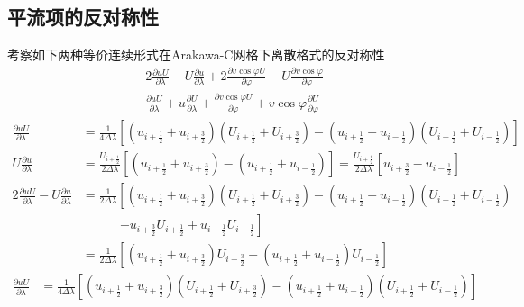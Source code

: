 \documentclass{ctexart}
\begin{document}
\begin{appendix}

\section{平流项的反对称性}
\label{app:平流项的反对称性}
考察如下两种等价连续形式在Arakawa-C网格下离散格式的反对称性
\begin{align}
  2 \frac{\partial u U}{\partial \lambda} - U \frac{\partial u}{\partial \lambda} + 2 \frac{\partial v \cos{\varphi} U}{\partial \varphi} - U \frac{\partial v \cos{\varphi}}{\partial \varphi} \\
  \frac{\partial u U}{\partial \lambda} + u \frac{\partial U}{\partial \lambda} + \frac{\partial v \cos{\varphi} U}{\partial \varphi} + v \cos{\varphi} \frac{\partial U}{\partial \varphi}
\end{align}
\begin{align}
  \frac{\partial u U}{\partial \lambda} & = \frac{1}{4 \Delta{\lambda}} \left[ \left( u_{i+\frac{1}{2}} + u_{i+\frac{3}{2}} \right) \left( U_{i+\frac{1}{2}} + U_{i+\frac{3}{2}} \right) - \left( u_{i+\frac{1}{2}} + u_{i-\frac{1}{2}} \right) \left( U_{i+\frac{1}{2}} + U_{i-\frac{1}{2}} \right) \right] \nonumber \\
  U \frac{\partial u}{\partial \lambda} & = \frac{U_{i+\frac{1}{2}}}{2 \Delta{\lambda}} \left[ \left( u_{i+\frac{1}{2}} + u_{i+\frac{3}{2}} \right) - \left( u_{i+\frac{1}{2}} + u_{i-\frac{1}{2}} \right) \right] = \frac{U_{i+\frac{1}{2}}}{2 \Delta{\lambda}} \left[ u_{i+\frac{3}{2}} - u_{i-\frac{1}{2}} \right] \nonumber \\
  2 \frac{\partial u U}{\partial \lambda} - U \frac{\partial u}{\partial \lambda} & = \frac{1}{2 \Delta{\lambda}} \left[ \left( u_{i+\frac{1}{2}} + u_{i+\frac{3}{2}} \right) \left( U_{i+\frac{1}{2}} + U_{i+\frac{3}{2}} \right) - \left( u_{i+\frac{1}{2}} + u_{i-\frac{1}{2}} \right) \left( U_{i+\frac{1}{2}} + U_{i-\frac{1}{2}} \right) \right. \nonumber \\
  & \quad\quad\quad \left. - u_{i+\frac{3}{2}} U_{i+\frac{1}{2}} + u_{i-\frac{1}{2}} U_{i+\frac{1}{2}} \right] \nonumber \\
  & = \frac{1}{2 \Delta{\lambda}} \left[ \left( u_{i+\frac{1}{2}} + u_{i+\frac{3}{2}} \right) U_{i+\frac{3}{2}} - \left( u_{i+\frac{1}{2}} + u_{i-\frac{1}{2}} \right) U_{i-\frac{1}{2}} \right] \label{eqn:平流项第一种形式离散格式}
\end{align}
\begin{align}
  \frac{\partial u U}{\partial \lambda} & = \frac{1}{4 \Delta{\lambda}} \left[ \left( u_{i+\frac{1}{2}} + u_{i+\frac{3}{2}} \right) \left( U_{i+\frac{1}{2}} + U_{i+\frac{3}{2}} \right) - \left( u_{i+\frac{1}{2}} + u_{i-\frac{1}{2}} \right) \left( U_{i+\frac{1}{2}} + U_{i-\frac{1}{2}} \right) \right] \nonumber \\

\end{align}
\end{appendix}
\end{document}
